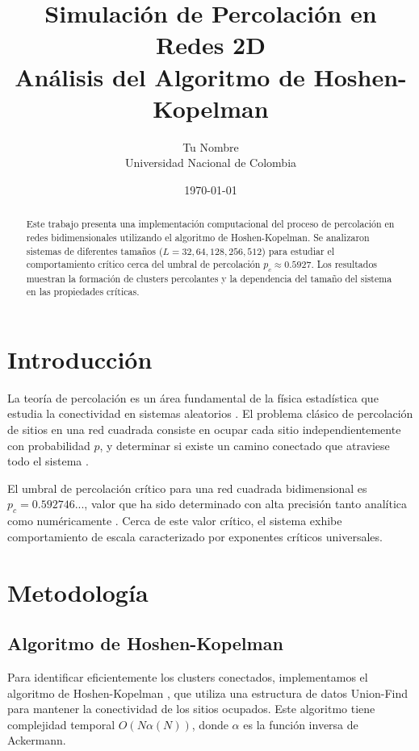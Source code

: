 \documentclass[11pt,a4paper]{article}
\title{Simulación de Percolación en Redes 2D\\
       Análisis del Algoritmo de Hoshen-Kopelman}
\author{Tu Nombre\\
        Universidad Nacional de Colombia}
\date{\today}
\begin{document}
\maketitle

\begin{abstract}
Este trabajo presenta una implementación computacional del proceso de percolación en redes bidimensionales utilizando el algoritmo de Hoshen-Kopelman. Se analizaron sistemas de diferentes tamaños ($L = 32, 64, 128, 256, 512$) para estudiar el comportamiento crítico cerca del umbral de percolación $p_c \approx 0.5927$. Los resultados muestran la formación de clusters percolantes y la dependencia del tamaño del sistema en las propiedades críticas.
\end{abstract}

\section{Introducción}

La teoría de percolación es un área fundamental de la física estadística que estudia la conectividad en sistemas aleatorios \cite{stauffer1994introduction}. El problema clásico de percolación de sitios en una red cuadrada consiste en ocupar cada sitio independientemente con probabilidad $p$, y determinar si existe un camino conectado que atraviese todo el sistema \cite{grimmett1999percolation}.

El umbral de percolación crítico para una red cuadrada bidimensional es $p_c = 0.592746...$, valor que ha sido determinado con alta precisión tanto analítica como numéricamente \cite{kesten1980critical}. Cerca de este valor crítico, el sistema exhibe comportamiento de escala caracterizado por exponentes críticos universales.

\section{Metodología}

\subsection{Algoritmo de Hoshen-Kopelman}

Para identificar eficientemente los clusters conectados, implementamos el algoritmo de Hoshen-\linebreak Kopelman \cite{hoshen1976percolation}, que utiliza una estructura de datos Union-Find para mantener la conectividad de los sitios ocupados. Este algoritmo tiene complejidad temporal $O(N \alpha(N))$, donde $\alpha$ es la función inversa de Ackermann.
\end{document}
